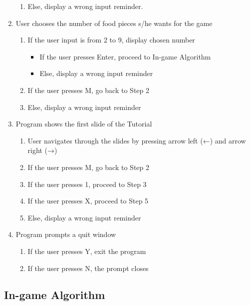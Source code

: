 \begin{enumerate}
\begin{enumerate}[label=\alph*.]
        \item Else, display a wrong input reminder.
    \end{enumerate}
    
    \item User chooses the number of food pieces s/he wants for the game
        \begin{enumerate}[label=\alph*]
            \item If the user input is from 2 to 9, display chosen number
            \begin{itemize}[label={}]
                \item If the user presses Enter, proceed to In-game Algorithm
                \item Else, display a wrong input reminder
            \end{itemize}
            \item If the user presses M, go back to Step 2
            \item Else, display a wrong input reminder
        \end{enumerate}
    \item Program shows the first slide of the Tutorial
        \begin{enumerate}[label=\alph*]
        \item User navigates through the slides by pressing arrow left (←) and arrow right (→)
        \item If the user presses M, go back to Step 2
        \item If the user presses 1, proceed to Step 3
        \item If the user presses X, proceed to Step 5
        \item Else, display a wrong input reminder
        \end{enumerate}
    \item Program prompts a quit window
        \begin{enumerate}[label=\alph*]
            \item If the user presses Y, exit the program
            \item If the user presses N, the prompt closes
        \end{enumerate}
\end{enumerate}


\subsection{In-game Algorithm}

